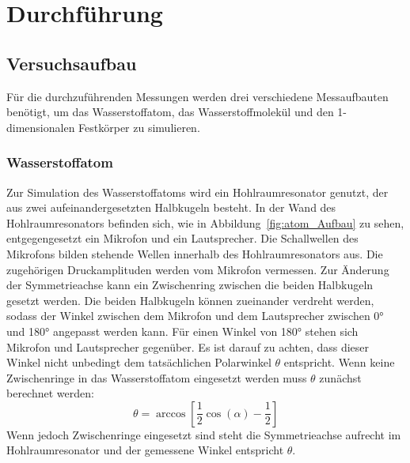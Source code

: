 \newpage
\section{Durchführung}
    \subsection{Versuchsaufbau}
        Für die durchzuführenden Messungen werden drei verschiedene Messaufbauten benötigt, um das Wasserstoffatom, das Wasserstoffmolekül und den 1-dimensionalen Festkörper zu simulieren. 
        \FloatBarrier
        \subsubsection*{Wasserstoffatom}
            Zur Simulation des Wasserstoffatoms wird ein Hohlraumresonator genutzt, der aus zwei aufeinandergesetzten Halbkugeln besteht. In der Wand des Hohlraumresonators befinden sich, wie in 
            Abbildung~\ref{fig:atom_Aufbau} zu sehen, entgegengesetzt ein Mikrofon und ein Lautsprecher. Die Schallwellen des Mikrofons bilden stehende Wellen innerhalb des Hohlraumresonators aus. Die 
            zugehörigen Druckamplituden werden vom Mikrofon vermessen. Zur Änderung der Symmetrieachse kann ein Zwischenring zwischen die beiden Halbkugeln gesetzt werden. Die beiden Halbkugeln können 
            zueinander verdreht werden, sodass der Winkel zwischen dem Mikrofon und dem Lautsprecher zwischen 0° und 180° angepasst werden kann. Für einen Winkel von 180° stehen sich Mikrofon und Lautsprecher
            gegenüber. Es ist darauf zu achten, dass dieser Winkel nicht unbedingt dem tatsächlichen Polarwinkel $\theta$ entspricht. Wenn keine Zwischenringe in das Wasserstoffatom eingesetzt werden muss 
            $\theta$ zunächst berechnet werden:
            \begin{equation*}
                \theta = \arccos\left[\frac{1}{2}\cos\left(\alpha\right) - \frac{1}{2}\right]
            \end{equation*}
            Wenn jedoch Zwischenringe eingesetzt sind steht die Symmetrieachse aufrecht im Hohlraumresonator und der gemessene Winkel entspricht $\theta$.
